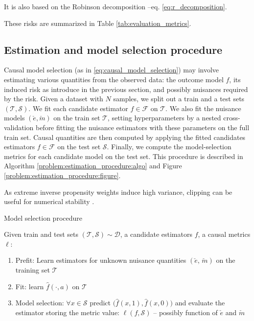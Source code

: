 \documentclass{report}
\begin{document}
It is also based on the Robinson decomposition --eq. \ref{eq:r_decomposition}. %

These risks are summarized in Table \ref{tab:evaluation_metrics}.


\subsection{Estimation and model selection procedure}\label{problem:estimation_procedure}

Causal model selection (as in
\autoref{eq:causal_model_selection}) may involve estimating various quantities
from the observed data: the outcome model $f$, its induced risk as
introduce in the previous section, and possibly nuisances required by the
risk.
Given a dataset with $N$ samples, we split out a train and a test sets
$(\mathcal{T}, \mathcal{S})$. We
fit each candidate estimator $f \in \mathcal{F}$ on $\mathcal{T}$. We also fit
the nuisance models $(\check e, \check m)$ on the train set
$\mathcal{T}$, setting hyperparameters by a nested
cross-validation before fitting the nuisance estimators with these parameters
on the full train set. Causal quantities are then computed by applying the fitted  candidates
estimators $f \in \mathcal{F}$ on the test set $\mathcal{S}$. Finally, we
compute the model-selection metrics for
each candidate model on the test set. This procedure is described in Algorithm
\ref{problem:estimation_procedure:algo} and Figure
\ref{problem:estimation_procedure:figure}.

As extreme inverse propensity weights induce high variance, clipping can be
useful for numerical stability
\citep{swaminathan_counterfactual_2015, ionides_truncated_2008}.

\begin{algorithm}[!htbp]
  \caption{Model selection procedure}\label{problem:estimation_procedure:algo} {%
    Given train and test sets $(\mathcal{T}, \mathcal{S}) \sim \mathcal{D}$,
    a candidate estimators $f$, a causal
    metrics $\ell$:
    \begin{enumerate}
      \item Prefit: Learn estimators for unknown nuisance quantities $(\check e,\,\check m)$ on the training set $\mathcal{T}$
      \item Fit: learn $\hat f(\cdot, a)$ on
            $\mathcal T$
      \item Model selection: $\forall{x} \in \mathcal{S}$ predict
            $\big(\hat f(x, 1), \hat f(x, 0)\big)$ and evaluate the estimator storing the metric value: $\ell(f, \mathcal S)$ -- possibly
            function of $\check e$ and $\check m$
    \end{enumerate}

  }
\end{algorithm}
\end{document}
